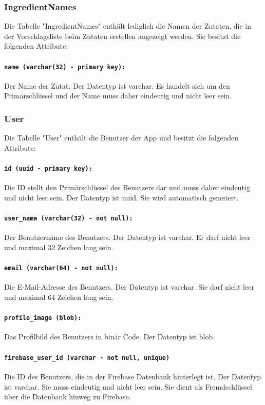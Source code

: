 \documentclass{entwurfsheft}
\begin{document}
\begin{sloppypar}
\subsubsection{IngredientNames}
Die Tabelle "IngredientNames" enthält lediglich die Namen der Zutaten, die in der Vorschlagsliste beim Zutaten erstellen angezeigt werden. Sie besitzt die folgenden Attribute:
\paragraph{\texttt{name (varchar(32) - primary key):}} Der Name der Zutat. Der Datentyp ist \Gls{varchar}. Es handelt sich um den Primärschlüssel und der Name muss daher eindeutig und nicht leer sein.
\newpage
\subsubsection{User}
Die Tabelle "User" enthält die Benutzer der App und besitzt die folgenden Attribute:
\paragraph{\texttt{id (uuid - primary key):}} Die ID stellt den Primärschlüssel des Benutzers dar und muss daher eindeutig und nicht leer sein. Der Datentyp ist \Gls{uuid}. Sie wird automatisch generiert.
\paragraph{\texttt{user\_name (varchar(32) - not null):}} Der Benutzername des Benutzers. Der Datentyp ist \Gls{varchar}. Er darf nicht leer und maximal 32 Zeichen lang sein.
\paragraph{\texttt{email (varchar(64) - not null):}} Die E-Mail-Adresse des Benutzers. Der Datentyp ist \Gls{varchar}. Sie darf nicht leer und maximal 64 Zeichen lang sein.
\paragraph{\texttt{profile\_image (blob):}} Das Profilbild des Benutzers in binär Code. Der Datentyp ist \Gls{blob}.
\paragraph{\texttt{firebase\_user\_id (varchar - not null, unique)}} Die ID des Benutzers, die in der Firebase Datenbank hinterlegt ist. Der Datentyp ist \Gls{varchar}. Sie muss eindeutig und nicht leer sein. Sie dient als Fremdschlüssel über die Datenbank hinweg zu Firebase.

\end{sloppypar}
\end{document}
